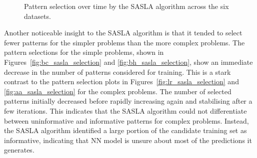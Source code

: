 \documentclass[conference]{IEEEtran}
\begin{document}
\begin{figure}[htbp]
		\hfil
		\caption{Pattern selection over time by the SASLA algorithm across the six datasets.}
		\label{fig:sasla_selection_all}
	\end{figure}
	
	Another noticeable insight to the SASLA algorithm is that it tended to select fewer patterns for the simpler problems than the more complex problems. The pattern selections for the simple problems, shown in Figures~\ref{fig:bc_sasla_selection} and \ref{fig:bh_sasla_selection}, show an immediate decrease in the number of patterns considered for training. This is a stark contrast to the pattern selection plots in Figures~\ref{fig:lr_sasla_selection} and \ref{fig:aa_sasla_selection} for the complex problems. The number of selected patterns initially decreased before rapidly increasing again and stabilising after a few iterations. This indicates that the SASLA algorithm could not differentiate between uninformative and informative patterns for complex problems. Instead, the SASLA algorithm identified a large portion of the candidate training set as informative, indicating that NN model is unsure about most of the predictions it generates.
	
\end{document}
